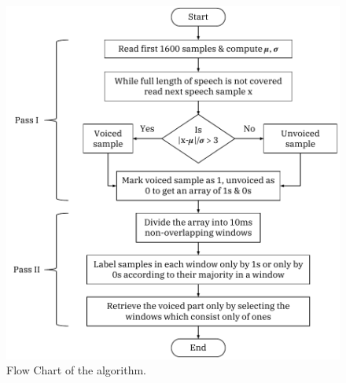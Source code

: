 \documentclass[12pt, a4paper, twoside]{report}
\begin{document}
\begin{figure}[!h]
	\centering
	\includegraphics[]
	{images/chapter2/s-remove-algorithm}
	\caption{Flow Chart of the algorithm.}
	\label{fig:s-remove-algorithm}
\end{figure}
\end{document}
